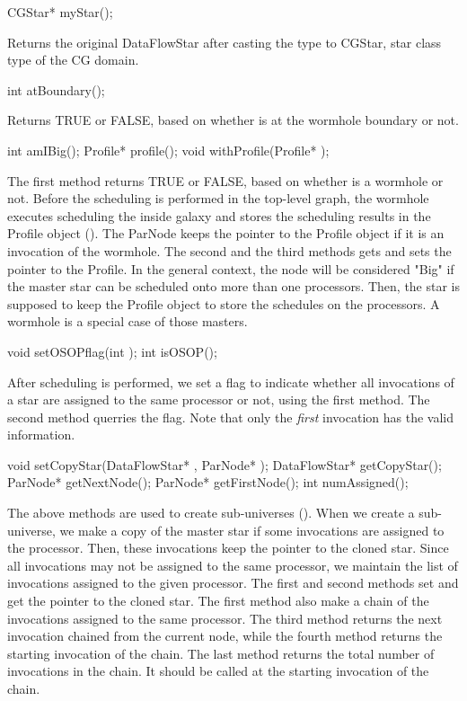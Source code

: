 \begin{example}
CGStar* myStar();
\end{example}

Returns the original DataFlowStar after casting the type to CGStar, star
class type of the CG domain.

\begin{example}
int atBoundary();
\end{example}

Returns TRUE or FALSE, based on whether  is at the wormhole
boundary or not.

\begin{example}
int amIBig();
Profile* profile();
void withProfile(Profile* );
\end{example}

The first method returns TRUE or FALSE, based on whether  is
a wormhole or not. 
Before the scheduling is performed in the top-level graph, the wormhole
executes scheduling the inside galaxy and stores the scheduling results
in the Profile object (). The ParNode keeps the pointer
to the Profile object if it is an invocation of the wormhole. The second
and the third methods gets and sets the pointer to the Profile. In the
general context, the node will be considered "Big" if the master star
can be scheduled onto more than one processors. Then, the star
is supposed to keep the Profile object to store the schedules on the
processors. A wormhole is a special case of those masters.

\begin{example}
void setOSOPflag(int );
int isOSOP();
\end{example}

After scheduling is performed, we set a flag to indicate whether all
invocations of a star are assigned to the same processor or not, using the
first method. The second method querries the flag. Note that only the
\emph{first} invocation has the valid information.

\begin{example}
void setCopyStar(DataFlowStar* , ParNode* );
DataFlowStar* getCopyStar();
ParNode* getNextNode();
ParNode* getFirstNode();
int numAssigned();
\end{example}

The above methods are used to create sub-universes 
(). When we create a sub-universe, we make a
copy of the master star if some invocations are assigned to the processor.
Then, these invocations keep the pointer to the cloned star. Since
all invocations may not be assigned to the same processor, we maintain
the list of invocations assigned to the given processor. The first and
second methods set and get the pointer to the cloned star. The first method
also make a chain of the invocations assigned to the same processor.
The third method returns the next invocation chained from the current node,
while the fourth method returns the starting invocation of the chain. The
last method returns the total number of invocations in the chain. It should
be called at the starting invocation of the chain.

